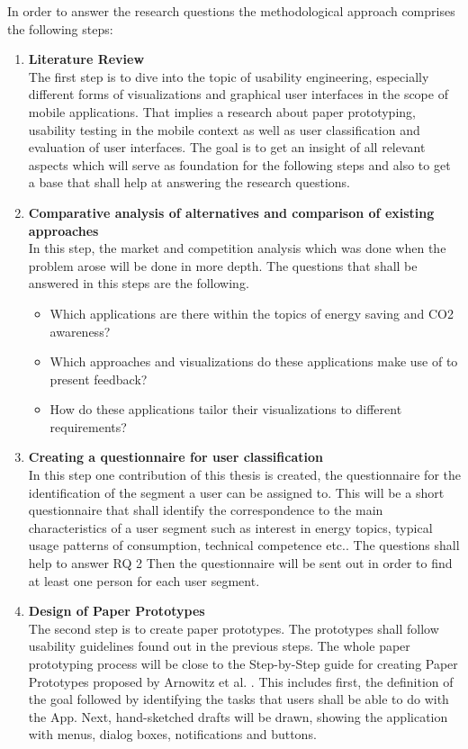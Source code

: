 In order to answer the research questions the methodological approach comprises the following steps:
\begin{enumerate}
	\item \textbf{Literature Review} \\
	The first step is to dive into the topic of usability engineering, especially different forms of visualizations and graphical user interfaces in the scope of mobile applications. That implies a research about paper prototyping, usability testing in the mobile context as well as user classification and evaluation of user interfaces. The goal is to get an insight of all relevant aspects which will serve as foundation for the following steps and also to get a base that shall help at answering the research questions.
	
	\item \textbf{Comparative analysis of alternatives and comparison of existing approaches} \\
	In this step, the market and competition analysis which was done when the problem arose will be done in more depth. The questions that shall be answered in this steps are the following.
	\begin{itemize}
		\item Which applications are there within the topics of energy saving and CO2 awareness?
		\item Which approaches and visualizations do these applications make use of to present feedback?
		\item How do these applications tailor their visualizations to different requirements?
	\end{itemize}

	\item \textbf{Creating a questionnaire for user classification} \\
	In this step one contribution of this thesis is created, the questionnaire for the identification of the segment a user can be assigned to. This will be a short questionnaire that shall identify the correspondence to the main characteristics of a user segment such as interest in energy topics, typical usage patterns of consumption, technical competence etc.. The questions shall help to answer RQ 2 Then the questionnaire will be sent out in order to find at least one person for each user segment.
	
	\item \textbf{Design of Paper Prototypes} \\
	The second step is to create paper prototypes. The prototypes shall follow usability guidelines found out in the previous steps. The whole paper prototyping process will be close to the Step-by-Step guide for creating Paper Prototypes proposed by Arnowitz et al. \cite{arnowitz2010effective}. This includes first, the definition of the goal followed by identifying the tasks that users shall be able to do with the App. Next, hand-sketched drafts will be drawn, showing the application with menus, dialog boxes, notifications and buttons.
	

\end{enumerate}
